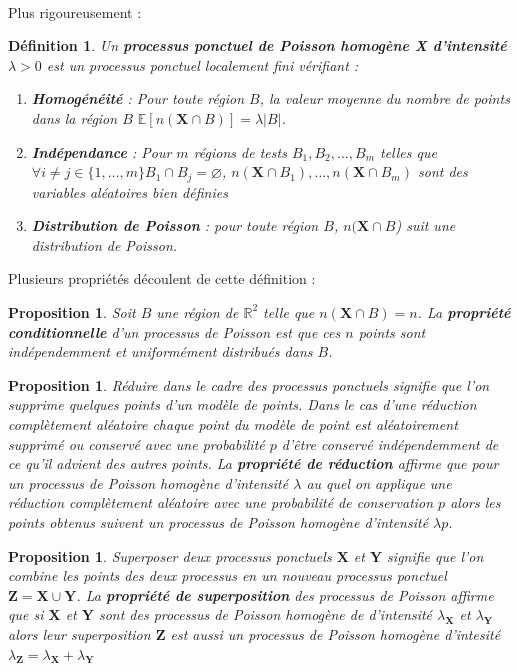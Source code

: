 \documentclass[12pt]{article}
\newcommand{\R}{\mathbb{R}}
\newtheorem{prop1}[thm1]{Proposition}
\newtheorem*{defin1}{Définition}
\begin{document}
\\
Plus rigoureusement :
\begin{defin1}
    Un \textbf{processus ponctuel de Poisson homogène X d'intensité $\lambda > 0$} est un processus ponctuel localement fini vérifiant :
    \begin{enumerate}
        \item \textbf{Homogénéité} : Pour toute région $B$, la valeur moyenne du nombre de points dans la région $B$ $\mathbb{E}[n(\textbf{X}\cap B)] = \lambda|B|$.
        \item \textbf{Indépendance} : Pour $m$ régions de tests $B_1,B_2,\dots,B_m$ telles que $\forall i \neq j \in \{1,\dots,m\} B_1 \cap B_j = \varnothing $, $n(\textbf{X}\cap B_1),\dots,n(\textbf{X}\cap B_m)$ sont des variables aléatoires bien définies
        \item \textbf{Distribution de Poisson} : pour toute région $B$, $n(\textbf{X}\cap B$) suit une distribution de Poisson.
    \end{enumerate}
\end{defin1}
Plusieurs propriétés découlent de cette définition :
\begin{prop1}
Soit $B$ une région de $\R^2$ telle que $n(\textbf{X} \cap B) =n$. La \textbf{propriété conditionnelle} d'un processus de Poisson est que ces $n$ points sont indépendemment et uniformément distribués dans $B$.
\end{prop1}

\begin{prop1}
Réduire dans le cadre des processus ponctuels signifie que l'on supprime quelques points d'un modèle de points. Dans le cas d'une \textit{réduction complètement aléatoire} chaque point du modèle de point est aléatoirement supprimé ou conservé avec une probabilité $p$ d'être conservé indépendemment de ce qu'il advient des autres points. La \textbf{propriété de réduction} affirme que pour un processus de Poisson homogène d'intensité $\lambda$ au quel on applique une réduction complètement aléatoire avec une probabilité de conservation $p$ alors les points obtenus suivent un processus de Poisson homogène d'intensité $\lambda p$.
\end{prop1}

\begin{prop1}
Superposer deux processus ponctuels $\textbf{X}$ et $\textbf{Y}$ signifie que l'on combine les points des deux processus en un nouveau processus ponctuel $\textbf{Z} = \textbf{X}  \cup \textbf{Y}$. La \textbf{propriété de superposition} des processus de Poisson affirme que si $\textbf{X}$ et $\textbf{Y}$ sont des processus de Poisson homogène de d'intensité $\lambda_{\textbf{X}}$ et $\lambda_{\textbf{Y}}$ alors leur superposition $\textbf{Z}$ est aussi un processus de Poisson homogène d'intesité $\lambda_{\textbf{Z}} = \lambda_{\textbf{X}} + \lambda_{\textbf{Y}}$
\end{prop1}
\end{document}

